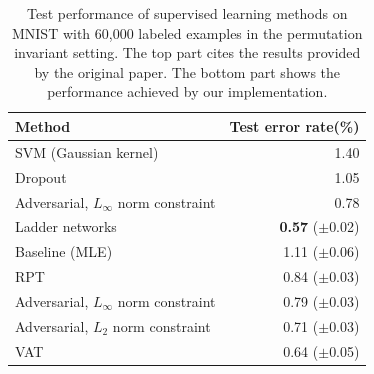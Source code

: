 \documentclass[10pt,journal,compsoc]{IEEEtran}
\newcommand\mnote[1]{\textcolor{blue}{(MIYATO: #1)}}
\newcommand\kwrite[1]{\textcolor{blue}{Koyama: #1}}
\begin{document}
\begin{table}[ht]
  \centering
		\caption{\label{tab:supMNIST}Test performance of supervised learning methods on MNIST with 60,000 labeled examples in the permutation invariant setting.  
        The top part cites the results provided by the original paper. 
        The bottom part shows the performance achieved by our implementation.  }
		\begin{tabular}{lr}
			\toprule
			Method & Test error rate(\%)  \\
			\midrule
            SVM (Gaussian kernel) & 1.40 \\
            Dropout \cite{srivastava2014dropout} & 1.05 \\
            Adversarial, $L_{\infty}$ norm constraint \cite{goodfellow2014explaining} & 0.78\\
            Ladder networks \cite{rasmus2015semi}& \textbf{0.57} ($\pm$0.02)\\
            \midrule
            Baseline (MLE) & 1.11 ($\pm$0.06)\\
            RPT & 0.84 ($\pm$0.03) \\
            Adversarial, $L_{\infty}$ norm constraint & 0.79 ($\pm$0.03)\\ %
            Adversarial, $L_2$ norm constraint & 0.71 ($\pm$0.03)\\ %
            VAT & 0.64 ($\pm$0.05) \\
			\bottomrule
		\end{tabular}
\end{table}
\end{document}
